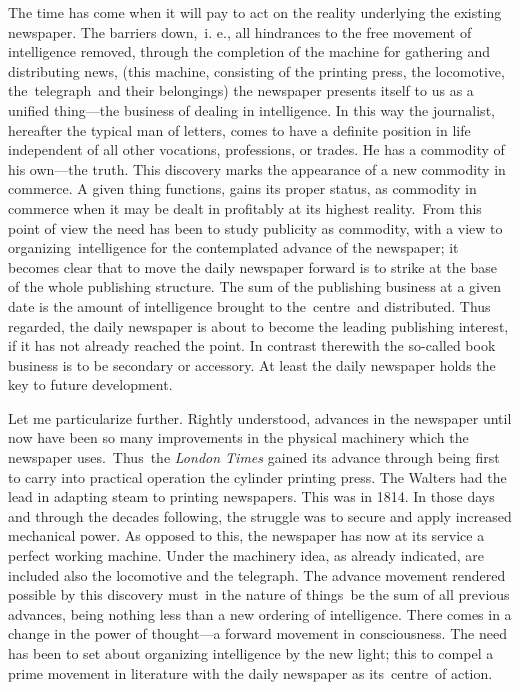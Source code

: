 \documentclass[openany,nobib]{tufte-book}
\begin{document}
The time has come when it will pay to act on the reality underlying the
existing newspaper. The barriers down,~i. e., all hindrances to the free
movement of intelligence removed, through the completion of the machine
for gathering and distributing news, (this machine, consisting of the
printing press, the locomotive, the~telegraph~and their belongings) the
newspaper presents itself to us as a unified thing---the business of
dealing in intelligence. In this way the journalist, hereafter the
typical man of letters, comes to have a definite position in life
independent of all other vocations, professions, or trades. He has a
commodity of his own---the truth. This discovery marks the appearance of
a new commodity in commerce. A given thing functions, gains its proper
status, as commodity in commerce when it may be dealt in profitably at
its highest reality.~From this point of view the need has been to study
publicity as commodity, with a view to organizing~intelligence for the
contemplated advance of the newspaper; it becomes clear that to move the
daily newspaper forward is to strike at the base of the whole publishing
structure. The sum of the publishing business at a given date is the
amount of intelligence brought to the~centre~and distributed. Thus
regarded, the daily newspaper is about to become the leading publishing
interest, if it has not already reached the point. In contrast therewith
the so-called book business is to be secondary or accessory. At least
the daily newspaper holds the key to future development.~~

Let me particularize further. Rightly understood, advances in the
newspaper until now have been so many improvements in the physical
machinery which the newspaper uses.~Thus~the \emph{London Times} gained
its advance through being first to carry into practical operation the
cylinder printing press. The Walters had the lead in adapting steam to
printing newspapers. This was in 1814. In those days and through the
decades following, the struggle was to secure and apply increased
mechanical power. As opposed to this, the newspaper has now at its
service a perfect working machine. Under the machinery idea, as already
indicated, are included also the locomotive and the telegraph. The
advance movement rendered possible by this discovery must~in the nature
of things~be the sum of all previous advances, being nothing less than a
new ordering of intelligence. There comes in a change in the power of
thought---a forward movement in consciousness. The need has been to set
about organizing intelligence by the new light; this to compel a prime
movement in literature with the daily newspaper as its~centre~of
action.~
\end{document}
